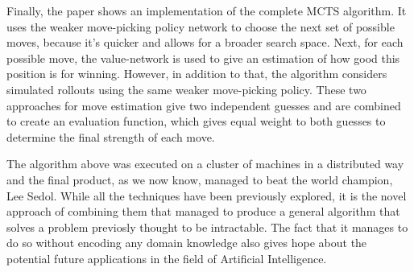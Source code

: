 \documentclass{article}
\begin{document}
Finally, the paper shows an implementation of the complete MCTS algorithm. It uses the weaker move-picking policy network to choose the next set of possible moves, because it's quicker and allows for a broader search space. Next, for each possible move, the value-network is used to give an estimation of how good this position is for winning. However, in addition to that, the algorithm considers simulated rollouts using the same weaker move-picking policy. These two approaches for move estimation give two independent guesses and are combined to create an evaluation function, which gives equal weight to both guesses to determine the final strength of each move.

The algorithm above was executed on a cluster of machines in a distributed way and the final product, as we now know, managed to beat the world champion, Lee Sedol. While all the techniques have been previously explored, it is the novel approach of combining them that managed to produce a general algorithm that solves a problem previosly thought to be intractable. The fact that it manages to do so without encoding any domain knowledge also gives hope about the potential future applications in the field of Artificial Intelligence.
\end{document}
